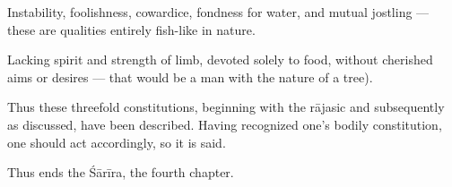 \begin{translation}
\begin{tt}
Instability, foolishness, cowardice, fondness for water, and mutual jostling — these are qualities entirely fish-like in nature.

\item[97]

Lacking spirit and strength of limb, devoted solely to food, without cherished aims or desires  — that would be a man with the nature of a tree).

\item[98]

Thus these threefold constitutions, beginning with the rājasic and subsequently as discussed, have been described. Having recognized one’s bodily constitution, one should act accordingly, so it is said. 

\item[99]

Thus ends the Śārīra, the fourth chapter.

\end{tt}
\end{translation}